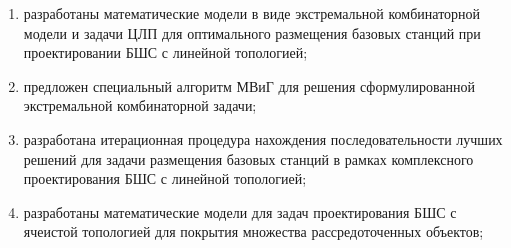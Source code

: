 \begin{enumerate}
  \item разработаны математические модели в виде экстремальной комбинаторной модели и
  задачи ЦЛП для оптимального размещения базовых станций при
  проектировании БШС с линейной топологией;
  \item предложен специальный алгоритм МВиГ для решения сформулированной
  экстремальной комбинаторной задачи;
  \item разработана итерационная процедура нахождения последовательности лучших
  решений для задачи размещения базовых станций в рамках комплексного
  проектирования БШС с линейной топологией;
  \item разработаны математические модели для задач проектирования БШС с ячеистой топологией для покрытия множества рассредоточенных объектов;
\end{enumerate}

